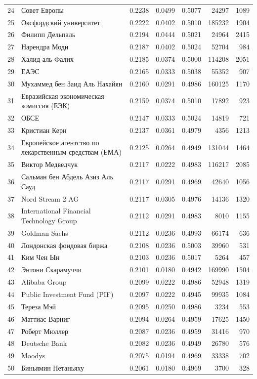 {\begin{longtable}{r >{\raggedright\arraybackslash}p{4.2cm} S[table-format=1.4] S[table-format=1.4] S[table-format=1.4] r r}
24 & Совет Европы & 0.2238 & 0.0499 & 0.5077 & 24297 & 1089 \\
25 & Оксфордский университет & 0.2222 & 0.0402 & 0.5010 & 185232 & 1904 \\
26 & Филипп Дельпаль & 0.2194 & 0.0444 & 0.5021 & 24964 & 2415 \\
27 & Нарендра Моди & 0.2187 & 0.0402 & 0.5024 & 52704 & 984 \\
28 & Халид аль-Фалих & 0.2185 & 0.0374 & 0.5000 & 114208 & 2051 \\
29 & ЕАЭС & 0.2165 & 0.0333 & 0.5038 & 55352 & 907 \\
30 & Мухаммед бен Заид Аль Нахайян & 0.2160 & 0.0291 & 0.4986 & 160125 & 1170 \\
31 & Евразийская экономическая комиссия (ЕЭК) & 0.2159 & 0.0374 & 0.5010 & 17892 & 923 \\
32 & ОБСЕ & 0.2147 & 0.0333 & 0.5024 & 14819 & 721 \\
33 & Кристиан Керн & 0.2137 & 0.0361 & 0.4979 & 4356 & 1213 \\
34 & Европейское агентство по лекарственным средствам (ЕМА) & 0.2125 & 0.0264 & 0.4949 & 131044 & 1464 \\
35 & Виктор Медведчук & 0.2117 & 0.0222 & 0.4983 & 116217 & 2085 \\
36 & Сальман бен Абдель Азиз Аль Сауд & 0.2117 & 0.0291 & 0.4969 & 42640 & 1056 \\
37 & Nord Stream 2 AG & 0.2117 & 0.0305 & 0.4976 & 14136 & 1320 \\
38 & International Financial Technology Group & 0.2112 & 0.0291 & 0.4983 & 8010 & 1155 \\
39 & Goldman Sachs & 0.2112 & 0.0236 & 0.4993 & 66174 & 636 \\
40 & Лондонская фондовая биржа & 0.2108 & 0.0236 & 0.5003 & 39960 & 531 \\
41 & Ким Чен Ын & 0.2103 & 0.0236 & 0.5017 & 5264 & 457 \\
42 & Энтони Скарамуччи & 0.2101 & 0.0180 & 0.4942 & 169990 & 1504 \\
43 & Alibaba Group & 0.2099 & 0.0222 & 0.4986 & 52948 & 1319 \\
44 & Public Investment Fund (PIF) & 0.2097 & 0.0222 & 0.4945 & 99935 & 1084 \\
45 & Тереза Мэй & 0.2095 & 0.0250 & 0.4986 & 3234 & 553 \\
46 & Маттиас Варниг & 0.2094 & 0.0264 & 0.4959 & 17625 & 1450 \\
47 & Роберт Мюллер & 0.2087 & 0.0236 & 0.4959 & 31416 & 970 \\
48 & Deutsche Bank & 0.2082 & 0.0236 & 0.4949 & 26780 & 576 \\
49 & Moodys & 0.2075 & 0.0194 & 0.4969 & 33338 & 702 \\
50 & Биньямин Нетаньяху & 0.2061 & 0.0180 & 0.4969 & 3700 & 328 \\
\end{longtable}
}

